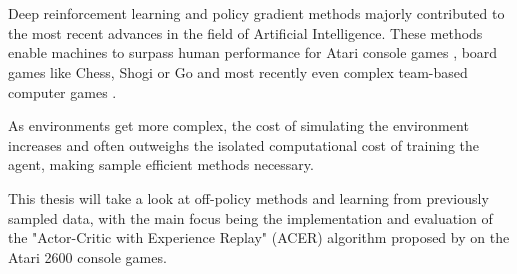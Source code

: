 \section*{}
Deep reinforcement learning and policy gradient methods majorly contributed to the most recent advances in the field of Artificial Intelligence.
These methods enable machines to surpass human performance for Atari console games \citep{mnih2015atari}, board games like Chess, Shogi \citep{Shogi17} or Go \citep{Go2017} and most recently even complex team-based computer games \citep{OpenAI_dota}.

As environments get more complex, the cost of simulating the environment increases and often outweighs the isolated computational cost of training the agent, making sample efficient methods necessary.

This thesis will take a look at off-policy methods and learning from previously sampled data, with the main focus being the implementation and evaluation of the "Actor-Critic with Experience Replay" (ACER) algorithm proposed by \citet{ACER} on the Atari 2600 console games.
